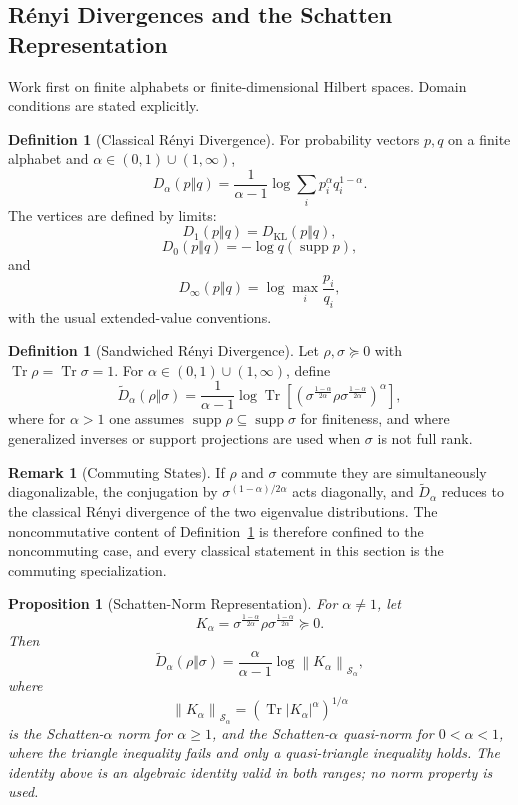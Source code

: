\documentclass[12pt]{article}
\newtheorem{proposition}[theorem]{Proposition}
\theoremstyle{definition}
\newtheorem{definition}[theorem]{Definition}
\newtheorem{remark}[theorem]{Remark}
\DeclareMathOperator{\Tr}{Tr}
\DeclareMathOperator{\supp}{supp}
\newcommand{\norm}[1]{\left\lVert#1\right\rVert}
\newcommand{\Sp}[1]{\mathcal S_{#1}}
\newcommand{\Ren}[1]{D_{#1}}
\newcommand{\sRen}[1]{\widetilde D_{#1}}
\newcommand{\KL}{D_{\mathrm{KL}}}
\begin{document}
\subsection{R\'enyi Divergences and the Schatten Representation}
\label{subsec:renyi-schatten}

Work first on finite alphabets or finite-dimensional Hilbert spaces.  Domain
conditions are stated explicitly.

\begin{definition}[Classical R\'enyi Divergence]
\label{def:classical-renyi}
For probability vectors $p,q$ on a finite alphabet and
$\alpha\in(0,1)\cup(1,\infty)$,
\[
\Ren{\alpha}(p\Vert q)
=
\frac{1}{\alpha-1}
\log
\sum_i p_i^\alpha q_i^{1-\alpha}.
\]
The vertices are defined by limits:
\[
\Ren{1}(p\Vert q)=\KL(p\Vert q),
\]
\[
\Ren{0}(p\Vert q)
=
-\log q(\supp p),
\]
and
\[
\Ren{\infty}(p\Vert q)
=
\log\max_i\frac{p_i}{q_i},
\]
with the usual extended-value conventions.
\end{definition}

\begin{definition}[Sandwiched R\'enyi Divergence]
\label{def:sandwiched-renyi}
Let $\rho,\sigma\succeq0$ with $\Tr\rho=\Tr\sigma=1$.  For
$\alpha\in(0,1)\cup(1,\infty)$, define
\[
\sRen{\alpha}(\rho\Vert\sigma)
=
\frac{1}{\alpha-1}
\log
\Tr\!\left[
\left(
\sigma^{\frac{1-\alpha}{2\alpha}}
\rho
\sigma^{\frac{1-\alpha}{2\alpha}}
\right)^\alpha
\right],
\]
where for $\alpha>1$ one assumes $\supp\rho\subseteq\supp\sigma$ for
finiteness, and where generalized inverses or support projections are used
when $\sigma$ is not full rank.
\end{definition}

\begin{remark}[Commuting States]
\label{rem:renyi-commuting}
If $\rho$ and $\sigma$ commute they are simultaneously diagonalizable, the
conjugation by $\sigma^{(1-\alpha)/2\alpha}$ acts diagonally, and
$\sRen{\alpha}$ reduces to the classical R\'enyi divergence of the two
eigenvalue distributions.  The noncommutative content of
Definition~\ref{def:sandwiched-renyi} is therefore confined to the
noncommuting case, and every classical statement in this section is the
commuting specialization.
\end{remark}

\begin{proposition}[Schatten-Norm Representation]
\label{prop:schatten-rep}
For $\alpha\neq1$, let
\[
K_\alpha
=
\sigma^{\frac{1-\alpha}{2\alpha}}
\rho
\sigma^{\frac{1-\alpha}{2\alpha}}
\succeq0.
\]
Then
\[
\sRen{\alpha}(\rho\Vert\sigma)
=
\frac{\alpha}{\alpha-1}
\log
\norm{K_\alpha}_{\Sp{\alpha}},
\]
where
\[
\norm{K_\alpha}_{\Sp{\alpha}}
=
\left(\Tr |K_\alpha|^\alpha\right)^{1/\alpha}
\]
is the Schatten-$\alpha$ norm for $\alpha\ge1$, and the Schatten-$\alpha$
\emph{quasi-norm} for $0<\alpha<1$, where the triangle inequality fails and
only a quasi-triangle inequality holds.  The identity above is an algebraic
identity valid in both ranges; no norm property is used.
\end{proposition}
\end{document}
